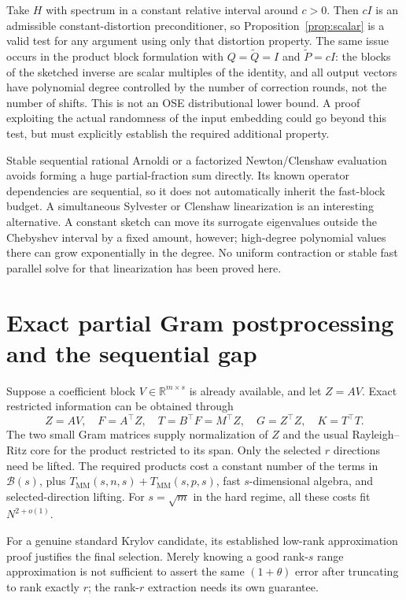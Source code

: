 \documentclass[11pt]{article}
\newcommand{\R}{\mathbb R}
\newcommand{\MM}{T_{\mathrm{MM}}}
\begin{document}
Take \(H\) with spectrum in a constant relative interval around
\(c>0\). Then \(cI\) is an admissible constant-distortion
preconditioner, so Proposition~\ref{prop:scalar} is a valid test for any
argument using only that distortion property. The same issue occurs in
the product block formulation with \(Q=\widetilde Q=I\) and
\(\widetilde P=cI\): the blocks of the sketched inverse are scalar
multiples of the identity, and all output vectors have polynomial degree
controlled by the number of correction rounds, not the number of shifts.
This is not an OSE distributional lower bound. A proof exploiting the
actual randomness of the input embedding could go beyond this test, but
must explicitly establish the required additional property.

Stable sequential rational Arnoldi or a factorized Newton/Clenshaw
evaluation avoids forming a huge partial-fraction sum directly. Its
known operator dependencies are sequential, so it does not automatically
inherit the fast-block budget. A simultaneous Sylvester or Clenshaw
linearization is an interesting alternative. A constant sketch can move
its surrogate eigenvalues outside the Chebyshev interval by a fixed
amount, however; high-degree polynomial values there can grow
exponentially in the degree. No uniform contraction or stable fast
parallel solve for that linearization has been proved here.

\section{Exact partial Gram postprocessing and the sequential gap}
Suppose a coefficient block \(V\in\R^{m\times s}\) is already
available, and let \(Z=AV\). Exact restricted information can be
obtained through
\[
 Z=AV,\quad F=A^\top Z,\quad T=B^\top F=M^\top Z,
 \quad G=Z^\top Z,\quad K=T^\top T.
\]
The two small Gram matrices supply normalization of \(Z\) and the
usual Rayleigh--Ritz core for the product restricted to its span. Only
the selected \(r\) directions need be lifted. The required products
cost a constant number of the terms in \(\mathcal B(s)\), plus
\(\MM(s,n,s)+\MM(s,p,s)\), fast \(s\)-dimensional algebra,
and selected-direction lifting. For \(s=\sqrt m\) in the hard
regime, all these costs fit \(N^{2+o(1)}\).

For a genuine standard Krylov candidate, its established low-rank
approximation proof justifies the final selection. Merely knowing a
good rank-\(s\) range approximation is not sufficient to assert the
same \((1+\theta)\) error after truncating to rank exactly \(r\);
the rank-\(r\) extraction needs its own guarantee.
\end{document}
